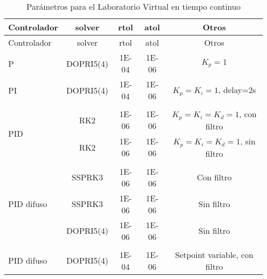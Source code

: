         {\setlength\LTleft{0pt}
        \setlength\LTright{0pt}
        \centering
        \footnotesize
        \renewcommand{\arraystretch}{0.89}
        \begin{longtable}{l @{\extracolsep{\fill}} cccc}
            \caption[Parámetros para el Laboratorio Virtual en tiempo continuo]{Parámetros para el Laboratorio Virtual en tiempo continuo} 
            \label{tab:parametrosLVc} \\
            \toprule
            Controlador  & solver & rtol & atol & Otros       \\ \midrule
            \endfirsthead
            \toprule
            Controlador  & solver & rtol & atol & Otros       \\ \midrule
            \endhead
            \bottomrule
            \endfoot
            P                           & DOPRI5(4)    & \num{1E-04} & \num{1E-06} & $K_p=1$                                   \\
            PI                          & DOPRI5(4)    & \num{1E-04} & \num{1E-06} & $K_p=K_i=1$, delay=2s                     \\
                                        &              &             &             &                                           \\[-3pt] 
            \multirow{2}{*}{PID}        & RK2          & \num{1E-06} & \num{1E-06} & $K_p=K_i=K_d=1$, con filtro               \\
                                        & RK2          & \num{1E-06} & \num{1E-06} & $K_p=K_i=K_d=1$, sin filtro               \\
                                        &              &             &             &                                           \\[-3pt]  
            \multirow{3}{*}{PID difuso} & SSPRK3       & \num{1E-06} & \num{1E-06} & Con filtro                                \\
                                        & SSPRK3       & \num{1E-06} & \num{1E-06} & Sin filtro                                \\
                                        & DOPRI5(4)    & \num{1E-06} & \num{1E-06} & Sin filtro                                \\
                                        &              &             &             &                                           \\[-3pt]  
            PID difuso                  & DOPRI5(4)    & \num{1E-04} & \num{1E-06} & Setpoint variable, con filtro             \\

\end{longtable}}
